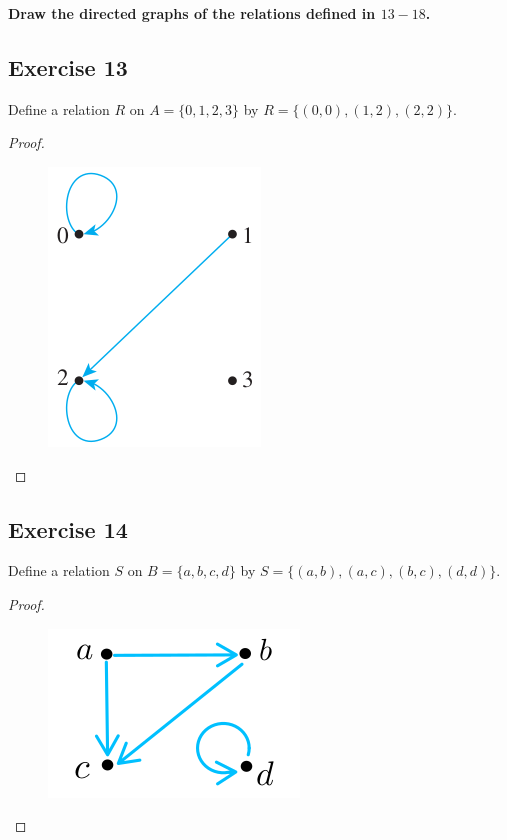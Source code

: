 \documentclass[14pt]{extarticle}
\newcommand{\cy}{\color{cyan}}
\begin{document}
{\bf \cy Draw the directed graphs of the relations defined in $13-18$.}

\subsection{Exercise 13}
Define a relation $R$ on \(A = \{0, 1, 2, 3\}\) by \(R = \{(0, 0), (1, 2), (2, 2)\}\).

\begin{proof}
        \begin{figure}[ht!]
                \centering
                \includegraphics[scale=0.4]{../images/8.1.13.png}
        \end{figure}
\end{proof}

\subsection{Exercise 14}
Define a relation $S$ on \(B = \{a, b, c, d\}\) by \(S = \{(a, b), (a, c), (b, c), (d, d)\}\).

\begin{proof}
        \begin{figure}[ht!]
                \centering
                \includegraphics[scale=0.4]{../images/8.1.14.png}
        \end{figure}
\end{proof}
\end{document}
